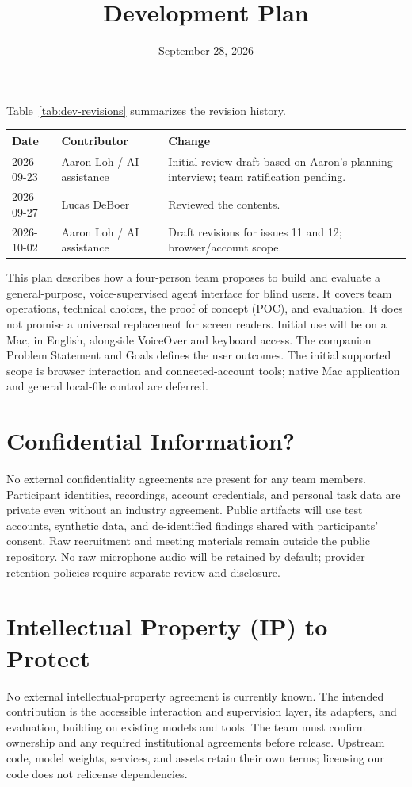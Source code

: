 \documentclass[11pt]{article}
\title{Development Plan\\\progname}
\author{\authname}
\date{September 28, 2026}
\begin{document}
\maketitle
Table~\ref{tab:dev-revisions} summarizes the revision history.
\begin{center}
\begin{minipage}{\textwidth}
\label{tab:dev-revisions}
\begin{tabularx}{\textwidth}{llX}
\toprule Date & Contributor & Change\\\midrule
2026-09-23 & Aaron Loh / AI assistance & Initial review draft based on Aaron's planning interview; team ratification pending.\\
2026-09-27 & Lucas DeBoer & Reviewed the contents.\\
2026-10-02 & Aaron Loh / AI assistance & Draft revisions for issues 11 and 12; browser/account scope.\\\bottomrule
\end{tabularx}
\end{minipage}
\end{center}

This plan describes how a four-person team proposes to build and evaluate a
general-purpose, voice-supervised agent interface for blind users. It covers
team operations, technical choices, the proof of concept (POC), and evaluation.
It does not promise a universal replacement for screen readers. Initial use
will be on a Mac, in English, alongside VoiceOver and keyboard access. The companion
Problem Statement and Goals defines the user outcomes. The initial supported
scope is browser interaction and connected-account tools; native Mac application
and general local-file control are deferred.

\section{Confidential Information?}
No external confidentiality agreements are present for any team members.
Participant identities, recordings, account credentials, and personal task data
are private even without an industry agreement. Public artifacts will use test
accounts, synthetic data, and de-identified findings shared with participants' consent. Raw recruitment
and meeting materials remain outside the public repository. No raw microphone
audio will be retained by default; provider retention policies require separate
review and disclosure.

\section{Intellectual Property (IP) to Protect}
No external intellectual-property agreement is currently known. The intended
contribution is the accessible interaction and supervision layer, its adapters,
and evaluation, building on existing models and tools. The team must confirm
ownership and any required institutional agreements before release. Upstream
code, model weights, services, and assets retain their own terms; licensing our
code does not relicense dependencies.
\end{document}
